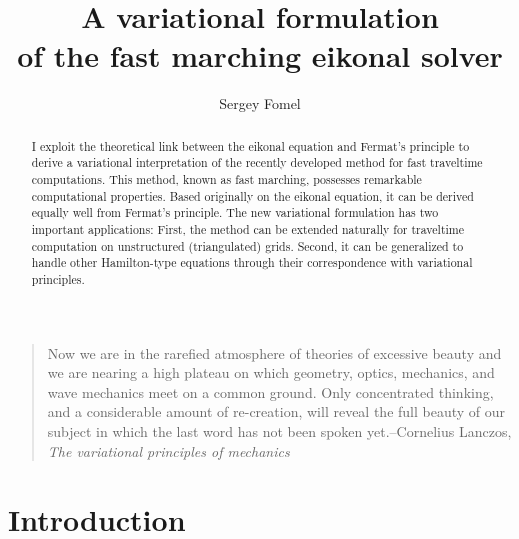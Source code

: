 
\title{A variational formulation \\ of the fast marching eikonal solver}


\author{Sergey Fomel}

\maketitle

\begin{abstract}
  I exploit the theoretical link between the eikonal equation and
  Fermat's principle to derive a variational interpretation of the
  recently developed method for fast traveltime computations. This
  method, known as fast marching, possesses remarkable computational
  properties. Based originally on the eikonal equation, it can be
  derived equally well from Fermat's principle.  The new variational
  formulation has two important applications: First, the method can be
  extended naturally for traveltime computation on unstructured
  (triangulated) grids. Second, it can be generalized to handle other
  Hamilton-type equations through their correspondence with
  variational principles.
\end{abstract}

\footnotesize
 \begin{quote}
   Now we are in the rarefied atmosphere of theories of excessive
   beauty and we are nearing a high plateau on which geometry, optics,
   mechanics, and wave mechanics meet on a common ground. Only
   concentrated thinking, and a considerable amount of re-creation,
   will reveal the full beauty of our subject in which the last word
   has not been spoken yet.--Cornelius Lanczos, \emph{The variational
     principles of mechanics}
 \end{quote}
\normalsize

\section{Introduction}

